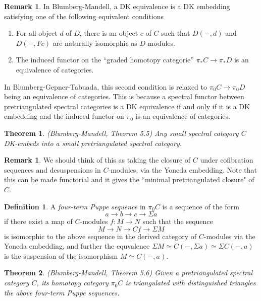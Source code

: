 \documentclass[letterpaper]{article}
\newtheorem{theorem}{Theorem}
\theoremstyle{definition}
\newtheorem{definition}[lemma]{Definition}
\newtheorem{remark}[lemma]{Remark}
\begin{document}
\begin{remark}
In Blumberg-Mandell, a DK equivalence is a DK embedding satisfying one of the following equivalent conditions 
\begin{enumerate}
\item For all object $d$ of $D$, there is an object $c$ of $C$ such that $D(-,d)$ and $D(-,Fc)$ are naturally isomorphic as $D$-modules.
\item The induced functor on the ``graded homotopy categorie'' $\pi_* C \rightarrow \pi_* D$ is an equivalence of categories. 
\end{enumerate}
In Blumberg-Gepner-Tabuada, this second condition is relaxed to $\pi_0 C \rightarrow \pi_0 D$ being an equivalence of categories. This is because a spectral functor between pretriangulated spectral categories is a DK equivalence if and only if it is a DK embedding and the induced functor on $\pi_0$ is an equivalence of categories. 
\end{remark}

\begin{theorem}(Blumberg-Mandell, Theorem 5.5)
Any small spectral category $C$ DK-embeds into a small pretriangulated spectral category. 
\end{theorem}

\begin{remark}
We should think of this as taking the closure of $C$ under cofibration sequences and desuspensions in $C$-modules, via the Yoneda embedding. Note that this can be made functorial and it gives the ``minimal pretriangulated closure" of $C$. 
\end{remark}

\begin{definition}
A \textit{four-term Puppe sequence} in $\pi_0 C$ is a sequence of the form
$$a \rightarrow b \rightarrow c \rightarrow \Sigma a$$
if there exist a map of $C$-modules $f : M \rightarrow N$ such that the sequence
$$M \rightarrow N \rightarrow Cf \rightarrow \Sigma M$$
is isomorphic to the above sequence in the derived category of $C$-modules via the Yoneda embedding, and further the equvalence $\Sigma M \simeq C(-,\Sigma a) \simeq \Sigma C(-,a)$ is the suspension of the isomorphism $M \simeq C(-,a)$. 
\end{definition}

\begin{theorem}(Blumberg-Mandell, Theorem 5.6)
Given a pretriangulated spectral category $C$, its homotopy category $\pi_0 C$ is triangulated with distinguished triangles the above four-term Puppe sequences. 
\end{theorem}
\end{document}
